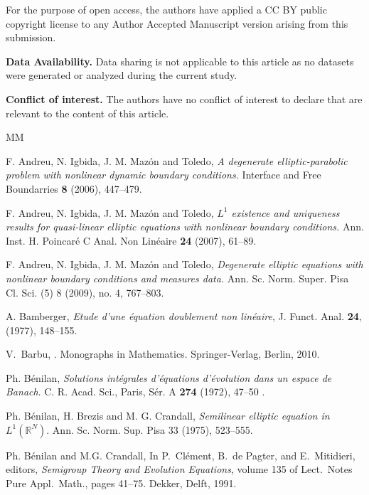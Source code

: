 \documentclass[reqno,12pt]{amsart}
\numberwithin{equation}{section} %
\begin{document}
For the purpose of open access, the authors have applied a CC BY public copyright license to any Author Accepted Manuscript version arising from this submission.
 

{\bf Data Availability.} Data sharing is not applicable to this article as no datasets were generated or
analyzed during the current study.
 

{\bf Conflict of interest.} The authors have no conflict of interest to declare that are relevant to the content of this
article.




\newcommand{\etalchar}[1]{$^{#1}$}
\begin{thebibliography}{MM}

 

  F. Andreu, N. Igbida, J. M.  Mazón and  Toledo, {\it A degenerate elliptic-parabolic problem with nonlinear dynamic boundary conditions.}
Interface  and Free Boundarries {\bf 8} (2006), 447--479.

  F. Andreu, N. Igbida, J. M.  Mazón and  Toledo, {\it  $L^1$  existence and uniqueness results for quasi-linear elliptic equations with nonlinear boundary conditions.}
Ann. Inst. H. Poincaré C Anal. Non Linéaire {\bf 24} (2007), 61--89.


  F. Andreu, N. Igbida, J. M.  Mazón and  Toledo, {\it Degenerate elliptic equations with nonlinear boundary conditions and measures data.}
Ann. Sc. Norm. Super. Pisa Cl. Sci. (5) 8 (2009), no. 4, 767--803.

  A. Bamberger, {\it Etude d’une équation doublement non linéaire}, J. Funct. Anal. {\bf 24}, 
(1977), 148--155.

V.~Barbu,
.
\newblock Monographs in Mathematics. Springer-Verlag, Berlin, 2010.


Ph. Bénilan, {\it Solutions intégrales d’équations d’évolution dans un espace de Banach}.
C. R. Acad. Sci., Paris, Sér. A  {\bf 274} (1972), 47--50 .

Ph. Bénilan, H. Brezis and M. G. Crandall, {\it Semilinear elliptic equation in $L^1(\mathbb{R}^N)$}. Ann. Sc.
Norm. Sup. Pisa 33 (1975), 523--555.

Ph. B{\'e}nilan and M.G. Crandall,
\newblock In P.\ Cl{\'e}ment, B.\ {de Pagter}, and E.\ Mitidieri, editors, {\em
  Semigroup {T}heory and {E}volution {E}quations}, volume 135 of   Lect.\
  Notes Pure Appl.\ Math., pages 41--75. Dekker, Delft, 1991.



\end{thebibliography}
\end{document}
